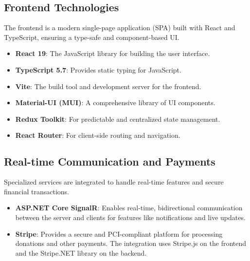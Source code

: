 \documentclass[12pt,a4paper]{article}
\begin{document}
\subsection*{Frontend Technologies}

The frontend is a modern single-page application (SPA) built with React and TypeScript, ensuring a type-safe and component-based UI.

\begin{tcolorbox}[colback=lightgray, colframe=secondarygreen, title=Core Frontend Stack]
    \begin{itemize}[leftmargin=*]
        \item \textbf{React 19}: The JavaScript library for building the user interface.
        \item \textbf{TypeScript 5.7}: Provides static typing for JavaScript.
        \item \textbf{Vite}: The build tool and development server for the frontend.
        \item \textbf{Material-UI (MUI)}: A comprehensive library of UI components.
        \item \textbf{Redux Toolkit}: For predictable and centralized state management.
        \item \textbf{React Router}: For client-side routing and navigation.
    \end{itemize}
\end{tcolorbox}

\newpage

\subsection*{Real-time Communication and Payments}

Specialized services are integrated to handle real-time features and secure financial transactions.

\begin{tcolorbox}[colback=lightgray, colframe=primaryblue, title=Key Integrations]
    \begin{itemize}[leftmargin=*]
        \item \textbf{ASP.NET Core SignalR}: Enables real-time, bidirectional communication between the server and clients for features like notifications and live updates.
        \item \textbf{Stripe}: Provides a secure and PCI-compliant platform for processing donations and other payments. The integration uses Stripe.js on the frontend and the Stripe.NET library on the backend.
    \end{itemize}
\end{tcolorbox}
\end{document}
